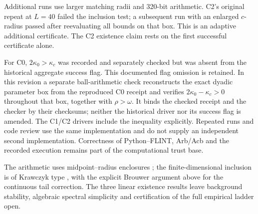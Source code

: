 Additional runs use larger matching radii and 320-bit arithmetic. C2's
original repeat at $L=40$ failed the inclusion test; a subsequent run
with an enlarged $c$-radius passed after reevaluating all bounds on that
box. This is an adaptive additional certificate. The C2 existence claim
rests on the first successful certificate alone.

For C0, $2\kappa_0>\kappa_c$ was recorded and separately checked but
was absent from the historical aggregate success flag. This documented
flag omission is retained. In this revision a separate ball-arithmetic
check reconstructs the exact dyadic parameter box from the reproduced
C0 receipt and verifies $2\kappa_0-\kappa_c>0$ throughout that box,
together with $\rho>\omega$. It binds the checked receipt and the checker
by their checksums; neither the historical driver nor its success flag
is amended.
The C1/C2 drivers include the inequality explicitly. Repeated runs and
code review use the same implementation and do not supply an independent
second implementation. Correctness of Python--FLINT, Arb/Acb and the
recorded execution remains part of the computational trust base.

The arithmetic uses midpoint--radius enclosures
\cite{Johansson2017Arb,PythonFlintDocs,FlintSoftware}; the finite-dimensional
inclusion is of Krawczyk type \cite{Krawczyk1969}, with the explicit
Brouwer argument above for the continuous tail correction. The three
linear existence results leave background stability, algebraic spectral
simplicity and certification of the full empirical ladder open.
